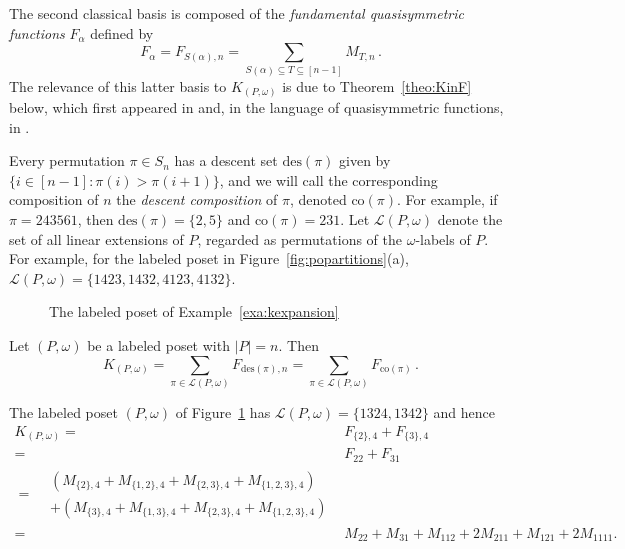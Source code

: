 \documentclass[ALCO,Unicode,published]{cedram}
\newcommand{\om}{\omega}
\newcommand{\kpw}{K_{(P,\om)}}
\newcommand{\des}{\mathrm{des}}
\renewcommand{\L}{\mathcal{L}}
\newcommand{\co}{\mathrm{co}}
\begin{document}
The second classical basis is composed of the \emph{fundamental quasisymmetric functions} $F_\alpha$ defined by 
\begin{equation}\label{equ:F2M}
F_\alpha = F_{S(\alpha), n} = \sum_{S(\alpha) \subseteq T  \subseteq [n-1]} M_{T,n}\,.
\end{equation}
The relevance of this latter basis to $\kpw$ is due to Theorem~\ref{theo:KinF} below, which first appeared in \cite{StaThesis71,StaThesis} and, in the language of quasisymmetric functions, in \cite{Ges84}.  

Every permutation $\pi \in S_n$ has a descent set $\des(\pi)$ given by $\{i \in [n-1] : \pi(i) > \pi(i+1)\}$, and we will call the corresponding composition of $n$ the \emph{descent composition} of $\pi$, denoted $\co(\pi)$.  For example, if $\pi = 243561$, then $\des(\pi) = \{2,5\}$ and $\co(\pi) = 231$.  Let $\L(P,\om)$ denote the set of all linear extensions of $P$, regarded as permutations of the $\om$-labels of $P$.  For example, for the labeled poset in Figure~\ref{fig:popartitions}(a), $\L(P,\om) = \{1423, 1432, 4123, 4132\}$.  

\begin{figure}
\begin{center}
\caption{The labeled poset of Example~\ref{exa:kexpansion}}
\label{fig:labeled_poset}
\end{center}
\end{figure}

\begin{theorem}\label{theo:KinF}
Let $(P,\om)$ be a labeled poset with $|P|=n$.  Then
\[
\kpw = \sum_{\pi \in \L(P,\om)} F_{\des(\pi), n} = \sum_{\pi \in \L(P,\om)} F_{\co(\pi)}\,.
\]
\end{theorem}

\begin{example}\label{exa:kexpansion}
The labeled poset $(P,\om)$ of Figure~\ref{fig:labeled_poset} has $\L(P,\om) = \{1324, 1342\}$ and hence
\begin{align*}
\kpw ={}& F_{\{2\},4} + F_{\{3\},4} \\
={}&  F_{22} + F_{31} \\ 
= \begin{split}  {}&(M_{\{2\},4} + M_{\{1,2\},4} + M_{\{2,3\},4} + M_{\{1,2,3\},4}) \\{}& + (M_{\{3\},4} + M_{\{1,3\},4} + M_{\{2,3\},4} + M_{\{1,2,3\},4}) \end{split} \\
={}&  M_{22} + M_{31} + M_{112}  + 2M_{211} + M_{121} + 2M_{1111}.
\end{align*}
\end{example}
\end{document}

